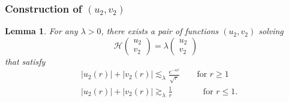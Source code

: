 \documentclass[11 pt]{amsart}
\newtheorem{lem}{Lemma}[section]
\theoremstyle{definition}
\theoremstyle{remark}
\numberwithin{equation}{section}
\begin{document}
\subsubsection{Construction of $(u_2, v_2)$}

\begin{lem}
  \label{const2}For any $\lambda > 0$, there exists a pair of functions $(u_2,
  v_2)$ solving
  \[ \mathcal{H} \left(\begin{array}{c}
       u_2\\
       v_2
     \end{array}\right) = \lambda \left(\begin{array}{c}
       u_2\\
       v_2
     \end{array}\right) \]
  that satisfy
\begin{align*}
& | u_2 (r) | + | v_2 (r) | \lesssim_{\lambda}  \frac{e^{- \kappa r}}{\sqrt{r}} \qquad \mbox{for $r \geq 1$} \\
& | u_2 (r) | + | v_2 (r) | \gtrsim_{\lambda} \frac{1}{r} \qquad \;\;\;\;\;\;  \mbox{for $r \leq 1$}.
\end{align*}
\end{lem}
\end{document}
